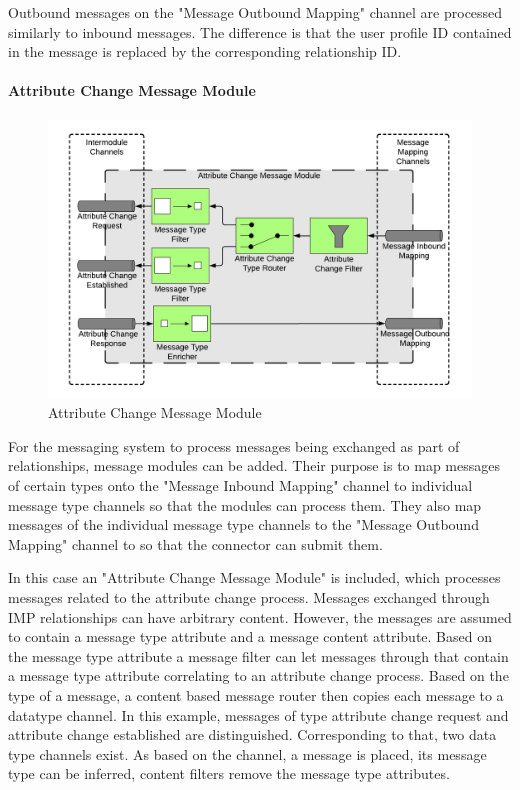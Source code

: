 Outbound messages on the "Message Outbound Mapping" channel are processed similarly to inbound messages. The difference is that the user profile ID contained in the message is replaced by the corresponding relationship ID.

\paragraph{Attribute Change Message Module}

\begin{figure}[H]
    \centering
    \includegraphics[scale=0.6]{Diagrams/Integration Architecture 1/Technological Integration/11. Attribute Change Message Module.pdf}
    \caption{Attribute Change Message Module}
    \label{integration1:attribute_change_message_module}
\end{figure}

For the messaging system to process messages being exchanged as part of relationships, message modules can be added. Their purpose is to map messages of certain types onto the "Message Inbound Mapping" channel to individual message type channels so that the modules can process them. They also map messages of the individual message type channels to the "Message Outbound Mapping" channel to so that the connector can submit them.

In this case an "Attribute Change Message Module" is included, which processes messages related to the attribute change process. Messages exchanged through IMP relationships can have arbitrary content. However, the messages are assumed to contain a message type attribute and a message content attribute. Based on the message type attribute a message filter can let messages through that contain a message type attribute correlating to an attribute change process. Based on the type of a message, a content based message router then copies each message to a datatype channel. In this example, messages of type attribute change request and attribute change established are distinguished. Corresponding to that, two data type channels exist. As based on the channel, a message is placed, its message type can be inferred, content filters remove the message type attributes.

